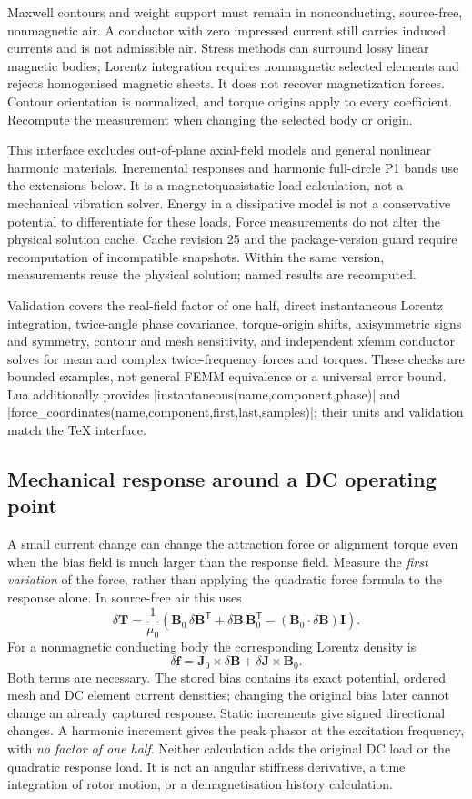 Maxwell contours and weight support must remain in nonconducting, source-free,
nonmagnetic air. A conductor with zero impressed current still carries induced
currents and is not admissible air. Stress methods can surround lossy linear
magnetic bodies; Lorentz integration requires nonmagnetic selected elements
and rejects homogenised magnetic sheets. It does not recover magnetization
forces. Contour orientation is normalized, and torque origins apply to every
coefficient. Recompute the measurement when changing the selected body or origin.

This interface excludes out-of-plane axial-field models and general nonlinear
harmonic materials. Incremental responses and harmonic full-circle P1 bands
use the extensions below. It is a
magnetoquasistatic load calculation, not a mechanical vibration solver. Energy
in a dissipative model is not a conservative potential to differentiate for
these loads. Force measurements do not alter the physical solution cache. Cache revision 25 and the package-version guard require recomputation of
incompatible snapshots. Within the same version, measurements reuse the physical
solution; named results are recomputed.

Validation covers the real-field factor of one half, direct instantaneous
Lorentz integration, twice-angle phase covariance, torque-origin shifts,
axisymmetric signs and symmetry, contour and mesh sensitivity, and independent
xfemm conductor solves for mean and complex twice-frequency forces and torques.
These checks are bounded examples, not general FEMM equivalence or a universal
error bound. Lua additionally provides |instantaneous(name,component,phase)| and
|force_coordinates(name,component,first,last,samples)|; their units and validation
match the TeX interface.


\subsection{Mechanical response around a DC operating point}
\label{sec:mechanical-response}
A small current change can change the attraction force or alignment torque even
when the bias field is much larger than the response field. Measure the
\emph{first variation} of the force, rather than applying the quadratic force
formula to the response alone. In source-free air this uses
\[
 \delta\mathbf T=\frac1{\mu_0}\left(
 \mathbf B_0\,\delta\mathbf B^{\mathsf T}
 +\delta\mathbf B\,\mathbf B_0^{\mathsf T}
 -(\mathbf B_0\mathbin\cdot\delta\mathbf B)\mathbf I\right).
\]
For a nonmagnetic conducting body the corresponding Lorentz density is
\[
 \delta\mathbf f=\mathbf J_0\times\delta\mathbf B
                  +\delta\mathbf J\times\mathbf B_0.
\]
Both terms are necessary. The stored bias contains its exact potential, ordered
mesh and DC element current densities; changing the original bias later cannot
change an already captured response. Static increments give signed directional
changes. A harmonic increment gives the peak phasor at the excitation frequency,
with \emph{no factor of one half}. Neither calculation adds the original DC
load or the quadratic response load. It is not an angular stiffness derivative,
a time integration of rotor motion, or a demagnetisation history calculation.

